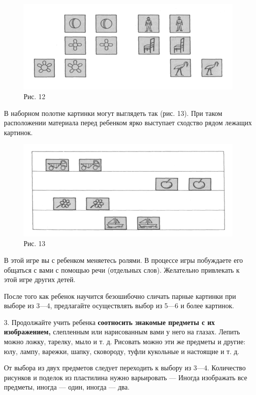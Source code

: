 \documentclass{book}
\begin{document}
\begin{figure}
\centering
\includegraphics[width=\linewidth]{media/media/image12.png}
\caption*{Рис. 12}
\end{figure}

В наборном полотне картинки могут выглядеть так (рис. 13). При таком
расположении материала перед ребенком ярко выступает сходство рядом
лежащих картинок.

\begin{figure}
\centering
\includegraphics[width=\linewidth]{media/media/image13.png}
\caption*{Рис. 13}
\end{figure}

В этой игре вы с ребенком меняетесь ролями. В процессе игры побуждаете
его общаться с вами с помощью речи (отдельных слов). Желательно
привлекать к этой игре других детей.

После того как ребенок научится безошибочно сличать парные картинки при
выборе из 3---4, предлагайте осуществлять выбор из 5---6 и более
картинок.

3. Продолжайте учить ребенка \textbf{соотносить знакомые предметы с их
изображением,} слепленным или нарисованным вами у него на глазах. Лепить
можно ложку, тарелку, мыло и т. д. Рисовать можно эти же предметы и
другие: юлу, лампу, варежки, шапку, сковороду, туфли кукольные и
настоящие и т. д.

От выбора из двух предметов следует переходить к выбору из 3---4.
Количество рисунков и поделок из пластилина нужно варьировать --- Иногда
изображать все предметы, иногда --- один, иногда --- два.
\end{document}
